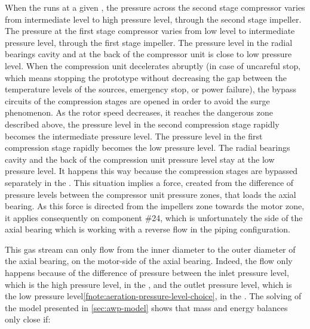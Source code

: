 When the \AWP{} runs at a given \OP{}, the pressure across the second
stage compressor varies from intermediate level to high pressure
level, through the second stage impeller. The pressure at the first
stage compressor varies from low level to intermediate pressure level,
through the first stage impeller. The pressure level in the radial
bearings cavity and at the back of the compressor unit is close to low
pressure level. When the compression unit decelerates abruptly (in
case of uncareful stop, which means stopping the prototype without
decreasing the gap between the temperature levels of the sources,
emergency stop, or power failure), the bypass circuits of the
compression stages are opened in order to avoid the surge
phenomenon. As the rotor speed decreases, it reaches the dangerous
zone described above, the pressure level in the second compression
stage rapidly becomes the intermediate pressure level. The pressure
level in the first compression stage rapidly becomes the low pressure
level. The radial bearings cavity and the back of the compression unit
pressure level stay at the low pressure level. It happens this way
because the compression stages are bypassed separately in the
\AWP{}. This situation implies a force, created from
the difference of pressure levels between the compressor unit pressure
zones, that loads the axial bearing. As this force is directed from
the impellers zone towards the motor zone, it applies consequently on
component \#24, which is unfortunately the side of the axial bearing
which is working with a reverse flow in the \AWP{} piping
configuration.

This gas stream can only flow from the inner diameter to the outer
diameter of the axial bearing, on the motor-side of the axial
bearing. Indeed, the flow only happens because of the difference of
pressure between the inlet pressure level, which is the high pressure
level, in the \AWP{},
and the outlet pressure level, which is the low pressure
level\cref{fnote:aeration-pressure-level-choice}, in the \AWP{}. The
solving of the model presented in \cref{sec:awp-model} shows that mass
and energy balances only close if:

